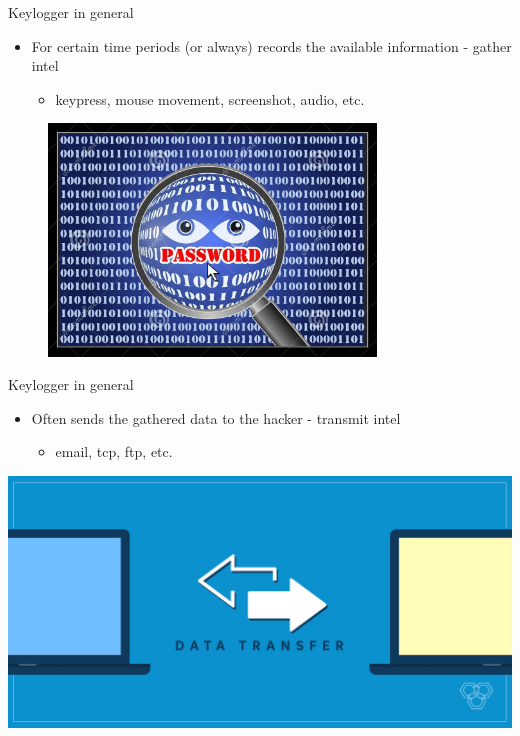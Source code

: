 \documentclass{beamer}
\begin{document}
\begin{frame}[t]{Keylogger in general}
\begin{itemize}
	\item For certain time periods (or always) records the available information - gather intel
	\begin{itemize}
		\item keypress, mouse movement, screenshot, audio, etc.
	\end{itemize}
\end{itemize}
\includegraphics[width=307pt, height=175pt]{../images/keyloggerrecords}
\end{frame}

\begin{frame}[t]{Keylogger in general}
\begin{itemize}
	\item Often sends the gathered data to the hacker - transmit intel
	\begin{itemize}
		\item email, tcp, ftp, etc.
	\end{itemize}
\end{itemize}
\vspace{1.7em}
\includegraphics[scale=0.19]{../images/keytransfer}
\end{frame}
\end{document}
